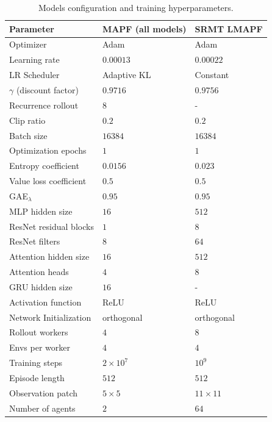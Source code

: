 \documentclass{article} %
\begin{document}
\begin{table}[htbp]
  \caption{Models configuration and training hyperparameters.}
  \medskip
  \label{tab:params}
  \centering
  \begin{tabular}{lll}
    \toprule
    Parameter & MAPF (all models) & SRMT LMAPF \\
    \midrule
    \midrule
    Optimizer & Adam & Adam \\
    Learning rate & $0.00013$ & $0.00022$ \\
    LR Scheduler & Adaptive KL & Constant\\
$\gamma$ (discount factor) & $0.9716$ & $0.9756$ \\
Recurrence rollout & $8$ & - \\
Clip ratio & $0.2$ & $0.2$ \\
Batch size & $16384$ & $16384$ \\
Optimization epochs & $1$ & $1$ \\
Entropy coefficient & $0.0156$ & $ 0.023$\\
Value loss coefficient & $0.5$ & $0.5$ \\
GAE$_\lambda$  & $0.95$ & $0.95$ \\
\midrule
MLP hidden size & $16$ & $512$ \\
ResNet residual blocks & $1$ & $8$ \\
ResNet filters & $8$ & $64$ \\
Attention hidden size & $16$ & $512$ \\
Attention heads & $4$ & $8$ \\
GRU hidden size & $16$ & - \\
Activation function & ReLU & ReLU \\
Network Initialization & orthogonal & orthogonal \\
Rollout workers & $4$ & $8$ \\
Envs per worker & $4$ & $4$ \\
Training steps & $2 \times 10^7$ & $10^9$ \\
\midrule
Episode length & $512$ & $512$ \\
Observation patch & $5\times 5$ & $11\times 11$ \\
Number of agents & $2$ & $64$ \\
    \bottomrule
  \end{tabular}
   
\end{table}
\end{document}
